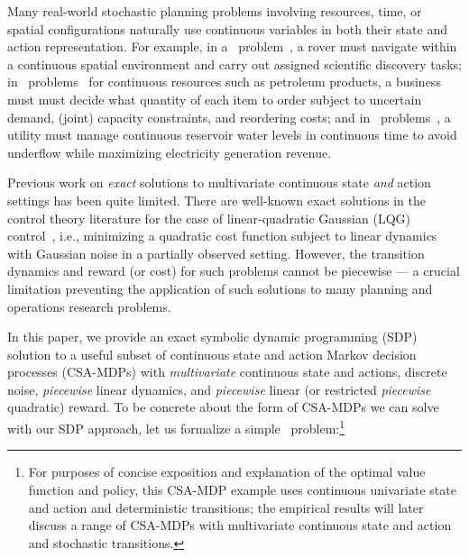 \label{sec:intro}

Many real-world stochastic planning problems involving resources,
time, or spatial configurations naturally use continuous variables in
both their state and action representation.  For example, in a
\MarsRover\ problem~\cite{bresina02}, a rover must navigate within a
continuous spatial environment and carry out assigned scientific
discovery tasks; in \InventoryControl\ problems~\cite{Mahootchi2009}
for continuous resources such as petroleum products, a business must
must decide what quantity of each item to order subject to uncertain
demand, (joint) capacity constraints, and reordering costs; and in
\WaterReservoir\ problems~\cite{reservoir}, a utility must manage continuous
reservoir water levels in continuous time to avoid underflow 
while maximizing electricity generation revenue.

Previous work on \emph{exact} solutions to multivariate continuous
state \emph{and} action settings has been quite limited.  There are
well-known exact solutions in the control theory literature for the
case of linear-quadratic Gaussian (LQG) control~\cite{lqgc}, i.e.,
minimizing a quadratic cost function subject to linear dynamics with
Gaussian noise in a partially observed setting.  However, the
transition dynamics and reward (or cost) for such problems 
cannot be piecewise --- a crucial limitation preventing the application
of such solutions to many planning and operations research problems. 

In this paper, we provide an exact symbolic dynamic programming (SDP)
solution to a useful subset of continuous state and action Markov
decision processes (CSA-MDPs) with \emph{multivariate} continuous
state and actions, discrete noise, \emph{piecewise} linear dynamics,
and \emph{piecewise} linear (or restricted \emph{piecewise} quadratic)
reward.  To be concrete about the form of CSA-MDPs we can solve with
our SDP approach, let us formalize a simple \MarsRover\
problem:\footnote{For purposes of concise exposition and explanation
of the optimal value function and policy, this CSA-MDP example uses
continuous univariate state and action and deterministic transitions;
the empirical results will later discuss a range of CSA-MDPs with
multivariate continuous state and action and stochastic transitions.}

